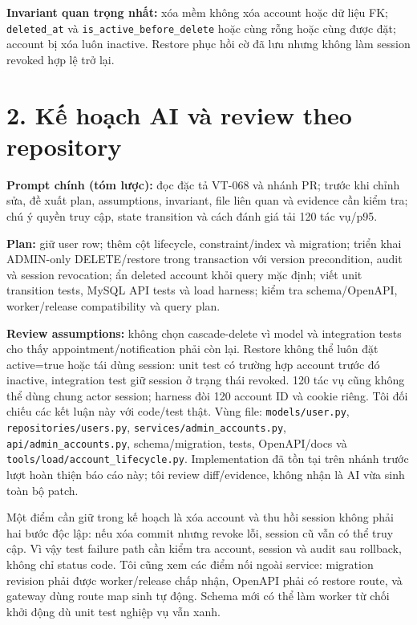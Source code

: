 \documentclass[10pt,a4paper]{article}
\begin{document}
\textbf{Invariant quan trọng nhất:} xóa mềm không xóa account hoặc dữ liệu FK; \texttt{deleted\_at} và \texttt{is\_active\_before\_delete} hoặc cùng rỗng hoặc cùng được đặt; account bị xóa luôn inactive. Restore phục hồi cờ đã lưu nhưng không làm session revoked hợp lệ trở lại.

\section*{2. Kế hoạch AI và review theo repository}
\textbf{Prompt chính (tóm lược):} đọc đặc tả VT-068 và nhánh PR; trước khi chỉnh sửa, đề xuất plan, assumptions, invariant, file liên quan và evidence cần kiểm tra; chú ý quyền truy cập, state transition và cách đánh giá tải 120 tác vụ/p95.

\textbf{Plan:} giữ user row; thêm cột lifecycle, constraint/index và migration; triển khai ADMIN-only DELETE/restore trong transaction với version precondition, audit và session revocation; ẩn deleted account khỏi query mặc định; viết unit transition tests, MySQL API tests và load harness; kiểm tra schema/OpenAPI, worker/release compatibility và query plan.

\textbf{Review assumptions:} không chọn cascade-delete vì model và integration tests cho thấy appointment/notification phải còn lại. Restore không thể luôn đặt active=true hoặc tái dùng session: unit test có trường hợp account trước đó inactive, integration test giữ session ở trạng thái revoked. 120 tác vụ cũng không thể dùng chung actor session; harness đòi 120 account ID và cookie riêng. Tôi đối chiếu các kết luận này với code/test thật. Vùng file: \texttt{models/user.py}, \texttt{repositories/users.py}, \texttt{services/admin\_accounts.py}, \texttt{api/admin\_accounts.py}, schema/migration, tests, OpenAPI/docs và \texttt{tools/load/account\_lifecycle.py}. Implementation đã tồn tại trên nhánh trước lượt hoàn thiện báo cáo này; tôi review diff/evidence, không nhận là AI vừa sinh toàn bộ patch.

Một điểm cần giữ trong kế hoạch là xóa account và thu hồi session không phải hai bước độc lập: nếu xóa commit nhưng revoke lỗi, session cũ vẫn có thể truy cập. Vì vậy test failure path cần kiểm tra account, session và audit sau rollback, không chỉ status code. Tôi cũng xem các điểm nối ngoài service: migration revision phải được worker/release chấp nhận, OpenAPI phải có restore route, và gateway dùng route map sinh tự động. Schema mới có thể làm worker từ chối khởi động dù unit test nghiệp vụ vẫn xanh.
\end{document}
